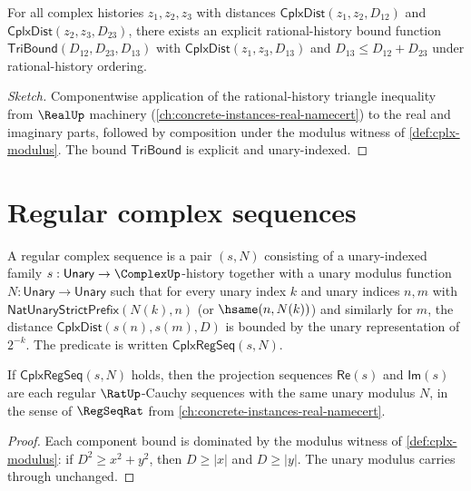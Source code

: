 \begin{lemma}
\label{lem:cplx-dist-triangle}
For all complex histories \(z_1, z_2, z_3\) with distances \(\mathsf{CplxDist}(z_1, z_2, D_{12})\) and \(\mathsf{CplxDist}(z_2, z_3, D_{23})\), there exists an explicit rational-history bound function \(\mathsf{TriBound}(D_{12}, D_{23}, D_{13})\) with \(\mathsf{CplxDist}(z_1, z_3, D_{13})\) and \(D_{13} \leq D_{12} + D_{23}\) under rational-history ordering.
\end{lemma}
\begin{proof}[Sketch]
Componentwise application of the rational-history triangle inequality from \(\RealUp\) machinery (\autoref{ch:concrete-instances-real-namecert}) to the real and imaginary parts, followed by composition under the modulus witness of \autoref{def:cplx-modulus}. The bound \(\mathsf{TriBound}\) is explicit and unary-indexed.
\end{proof}

\section{Regular complex sequences}

\begin{definition}
\label{def:cplx-regseq}
A regular complex sequence is a pair \((s, N)\) consisting of a unary-indexed family \(s : \mathsf{Unary} \to \ComplexUp\)-history together with a unary modulus function \(N : \mathsf{Unary} \to \mathsf{Unary}\) such that for every unary index \(k\) and unary indices \(n, m\) with \(\mathsf{NatUnaryStrictPrefix}(N(k), n)\) (or \(\hsame(n, N(k))\)) and similarly for \(m\), the distance \(\mathsf{CplxDist}(s(n), s(m), D)\) is bounded by the unary representation of \(2^{-k}\). The predicate is written \(\mathsf{CplxRegSeq}(s, N)\).
\end{definition}

\begin{lemma}
\label{lem:cplx-regseq-projects}
If \(\mathsf{CplxRegSeq}(s, N)\) holds, then the projection sequences \(\mathsf{Re}(s)\) and \(\mathsf{Im}(s)\) are each regular \(\RatUp\)-Cauchy sequences with the same unary modulus \(N\), in the sense of \(\RegSeqRat\) from \autoref{ch:concrete-instances-real-namecert}.
\end{lemma}
\begin{proof}
Each component bound is dominated by the modulus witness of \autoref{def:cplx-modulus}: if \(D^2 \geq x^2 + y^2\), then \(D \geq |x|\) and \(D \geq |y|\). The unary modulus carries through unchanged.
\end{proof}

